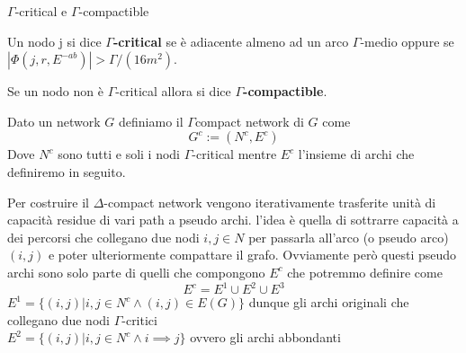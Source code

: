 \documentclass[a4paper, 11pt]{report}
\newcommand{\gmm}{$\Gamma$}
\begin{document}
    \begin{definition}{$\Gamma$-critical e $\Gamma$-compactible}{}
        
        Un nodo j si dice \textbf{$\Gamma$-critical} se è adiacente almeno ad un arco \gmm-medio oppure se $|\Phi (j, r, E^{-ab})| > \Gamma/(16m^2)$.

        \vspace*{7pt}
        \noindent Se un nodo non è $\Gamma$-critical allora si dice \textbf{$\Gamma$-compactible}.

        \vspace*{7pt}
        \noindent Dato un network $G$ definiamo il \gmm\-compact network di $G$ come \[G^c := (N^c, E^c)\]
        Dove $N^c$ sono tutti e soli i nodi \gmm-critical mentre $E^c$ l'insieme di archi che definiremo in seguito.
    \end{definition}
    Per costruire il $\Delta$-compact network vengono iterativamente trasferite unità di capacità residue di vari path a pseudo archi. 
    l'idea è quella di sottrarre capacità a dei percorsi che collegano due nodi $i,j\in N$ per passarla all'arco (o pseudo arco) $(i,j)$ e poter ulteriormente compattare il grafo.
    Ovviamente però questi pseudo archi sono solo parte di quelli che compongono $E^c$ che potremmo definire come 
    \[E^c = E^1\cup E^2 \cup E^3\]
    $E^1 = \{(i,j) | i,j\in N^c \land (i,j) \in E(G)\}$ dunque gli archi originali che collegano due nodi \gmm-critici\\
    $E^2 = \{(i,j) | i,j\in N^c \land i\implies j\}$ ovvero gli archi abbondanti 
\end{document}
